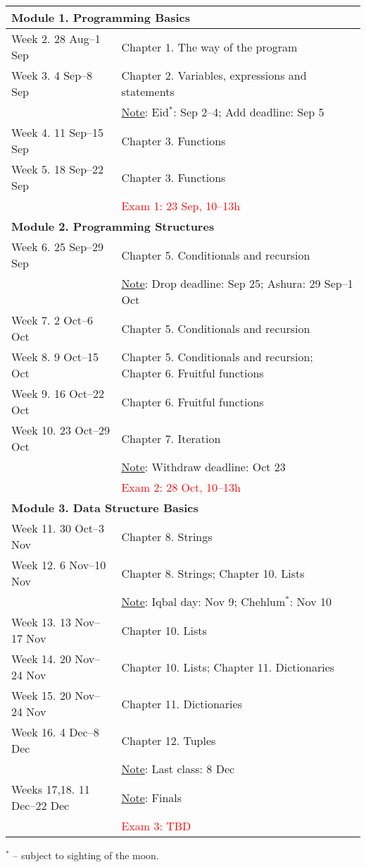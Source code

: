 \documentclass[a4paper]{article}
\begin{document}
\noindent\begin{tabularx}{\textwidth}{lp{}}
  \hline
  \multicolumn{2}{l}{\bf Module 1. Programming Basics}\\\hline
  Week 2. 28 Aug--1 Sep & Chapter 1. The way of the program\\
  Week 3. 4 Sep--8 Sep & Chapter 2. Variables, expressions and statements\\
  & \underline{Note}: Eid$^*$: Sep 2--4; Add deadline: Sep 5\\
  Week 4. 11 Sep--15 Sep & Chapter 3. Functions\\
  Week 5. 18 Sep--22 Sep & Chapter 3. Functions\\
  & \textcolor{red}{Exam 1: 23 Sep, 10--13h}\\\hline
  \multicolumn{2}{l}{\bf Module 2. Programming Structures}\\\hline
  Week 6. 25 Sep--29 Sep & Chapter 5. Conditionals and recursion\\
  & \underline{Note}: Drop deadline: Sep 25; Ashura: 29 Sep--1 Oct\\
  Week 7. 2 Oct--6 Oct & Chapter 5. Conditionals and recursion\\
  Week 8. 9 Oct--15 Oct & Chapter 5. Conditionals and recursion; Chapter 6. Fruitful functions\\
  Week 9. 16 Oct--22 Oct & Chapter 6. Fruitful functions\\
  Week 10. 23 Oct--29 Oct & Chapter 7. Iteration\\
  & \underline{Note}: Withdraw deadline: Oct 23\\
  & \textcolor{red}{Exam 2: 28 Oct, 10--13h}\\\hline
  \multicolumn{2}{l}{\bf Module 3. Data Structure Basics}\\\hline
  Week 11. 30 Oct--3 Nov & Chapter 8. Strings\\
  Week 12. 6 Nov--10 Nov & Chapter 8. Strings; Chapter 10. Lists\\
  & \underline{Note}: Iqbal day: Nov 9; Chehlum$^*$: Nov 10\\
  Week 13. 13 Nov--17 Nov & Chapter 10. Lists\\
  Week 14. 20 Nov--24 Nov & Chapter 10. Lists; Chapter 11. Dictionaries\\
  Week 15. 20 Nov--24 Nov & Chapter 11. Dictionaries \\ 
  Week 16. 4 Dec--8 Dec & Chapter 12. Tuples\\
  & \underline{Note}: Last class: 8 Dec\\
  Weeks 17,18. 11 Dec--22 Dec & \underline{Note}: Finals \\
  & \textcolor{red}{Exam 3: TBD}\\\hline
\end{tabularx}
$^*$ -- subject to sighting of the moon.
\end{document}
